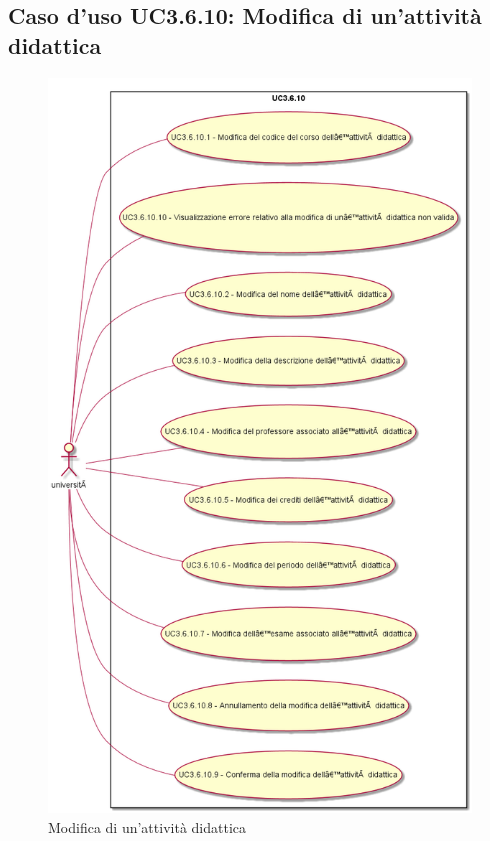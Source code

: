 \subsection{Caso d'uso \texorpdfstring{UC3.6.10}{UC3.6.10}: Modifica di un'attività didattica}
\begin{figure} [H]
\centering
\includegraphics[scale=0.45]{./img/UC3-6-10.png}
\caption{Modifica di un'attività didattica}\label{}
\end{figure}
